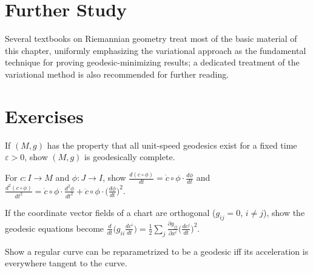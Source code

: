 \section{Further Study}

Several textbooks on Riemannian geometry treat most of the basic material of this
chapter, uniformly emphasizing the variational approach as the fundamental
technique for proving geodesic-minimizing results; a dedicated treatment of the
variational method is also recommended for further reading.

\section{Exercises}

\begin{remark}
  \label{rem:pet-ch5-ex-1}
  If $(M,g)$ has the property that all unit-speed geodesics exist for a fixed time
  $\varepsilon>0$, show $(M,g)$ is geodesically complete.
\end{remark}

\begin{remark}
  \label{rem:pet-ch5-ex-2}
  For $c:I\to M$ and $\phi:J\to I$, show
  $\frac{d(c\circ\phi)}{dt}=\dot c\circ\phi\cdot\frac{d\phi}{dt}$ and
  $\frac{d^2(c\circ\phi)}{dt^2}=\dot c\circ\phi\cdot\frac{d^2\phi}{dt^2}
  +\ddot c\circ\phi\cdot\big(\frac{d\phi}{dt}\big)^2$.
\end{remark}

\begin{remark}
  \label{rem:pet-ch5-ex-3}
  If the coordinate vector fields of a chart are orthogonal ($g_{ij}=0$, $i\ne j$),
  show the geodesic equations become
  $\frac{d}{dt}\big(g_{ii}\frac{dc^i}{dt}\big)=\frac12\sum_j\frac{\partial g_{jj}}
  {\partial x^i}\big(\frac{dc^j}{dt}\big)^2$.
\end{remark}

\begin{remark}
  \label{rem:pet-ch5-ex-4}
  Show a regular curve can be reparametrized to be a geodesic iff its acceleration
  is everywhere tangent to the curve.
\end{remark}

